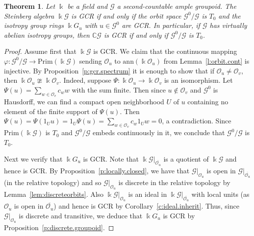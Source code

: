 \documentclass[11pt,reqno]{amsart}
\newtheorem{thm}{Theorem}[section]
\theoremstyle{plain}
\numberwithin{equation}{section}
\newcommand{\prim}{\mathrm{Prim}}
\newcommand{\G}[0]{\mathscr{G}}
\newcommand{\orb}[0]{\mathcal{O}}
\begin{document}
\begin{thm}\label{t:GCRthm}
Let $\Bbbk$ be a field and $\mathscr G$ a second-countable ample groupoid.  The Steinberg algebra $\Bbbk\G$ is GCR if and only if the orbit space $\G^0/\G$ is $T_0$ and the isotropy group rings $\Bbbk G_u$ with $u\in \mathscr G^0$ are GCR. In particular, if $\G$ has virtually abelian isotropy groups, then $\mathbb C\G$ is GCR if and only if $\mathscr G^0/\G$ is $T_0$.
\end{thm}
\begin{proof}
Assume first that $\Bbbk\G$ is GCR.  We claim that the continuous mapping $\varphi\colon \mathscr G^0/\G\to \prim(\Bbbk\G)$ sending $\orb_u$ to $\mathrm{ann}(\Bbbk \orb_u)$ from Lemma~\ref{l:orbit.cont} is injective.  By Proposition~\ref{p:gcr.spectrum} it is enough to show that if $\orb_u\neq \orb_v$, then $\Bbbk\orb_u\ncong \Bbbk \orb_v$.  Indeed, suppose $\Psi\colon \Bbbk\orb_u\to \Bbbk \orb_v$ is an isomorphism.  Let $\Psi(u) = \sum_{w\in \orb_v} c_ww$ with the sum finite.  Then since $u\notin \orb_v$ and $\mathscr G^0$ is Hausdorff, we can find a compact open neighborhood $U$ of $u$ containing  no element of the finite support of $\Psi(u)$.  Then $\Psi(u) = \Psi(1_Uu)=1_U\Psi(u) = \sum_{w\in \orb_v}c_w1_Uw=0$, a contradiction.
Since $\prim(\Bbbk\G)$ is $T_0$ and $\mathscr G^0/\G$ embeds continuously in it, we conclude that $\G^0/\G$ is $T_0$.

Next we verify that $\Bbbk G_u$ is GCR.  Note that $\Bbbk \mathscr G|_{\overline{\orb_u}}$ is a quotient of $\Bbbk\G$ and hence is GCR.  By Proposition~\ref{p:locally.closed}, we have that $\mathscr G|_{\orb_u}$ is open in $\mathscr G|_{\overline{\orb_u}}$ (in the relative topology) and so $\mathscr G|_{\orb_u}$ is discrete in the relative topology by Lemma~\ref{lem:discreteorbits}.  Also $\Bbbk\mathscr G|_{\orb_u}$ is an ideal in $\Bbbk\mathscr G|_{\overline{\orb_u}}$ with local units (as $\orb_u$ is open in $\overline{\orb_u}$) and hence is GCR by Corollary~\ref{c:ideal.inherit}.  Thus, since $\mathscr G|_{\orb_u}$ is discrete and transitive, we deduce that $\Bbbk G_u$ is GCR by Proposition~\ref{p:discrete.groupoid}.


\end{proof}
\end{document}

